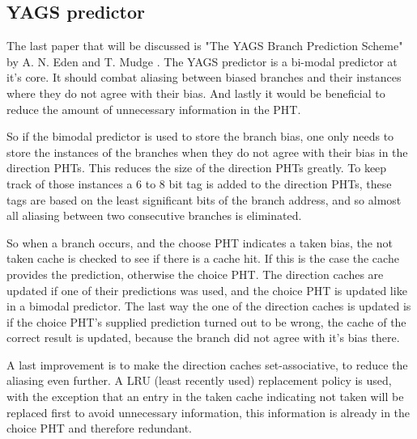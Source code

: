 \subsection{YAGS predictor}
\label{ssec:yags}
The last paper that will be discussed is "The YAGS Branch Prediction Scheme" by A. N. Eden and T. Mudge \cite{yags}.
The YAGS predictor is a bi-modal predictor at it's core.
It should combat aliasing between biased branches and their instances where they do not agree with their bias.
And lastly it would be beneficial to reduce the amount of unnecessary information in the PHT.

So if the bimodal predictor is used to store the branch bias, one only needs to store the instances of the branches when they do not agree with their bias in the direction PHTs.
This reduces the size of the direction PHTs greatly.
To keep track of those instances a 6 to 8 bit tag is added to the direction PHTs, these tags are based on the least significant bits of the branch address, and so almost all aliasing between two consecutive branches is eliminated.

So when a branch occurs, and the choose PHT indicates a taken bias, the not taken cache is checked to see if there is a cache hit.
If this is the case the cache provides the prediction, otherwise the choice PHT.
The direction caches are updated if one of their predictions was used, and the choice PHT is updated like in a bimodal predictor.
The last way the one of the direction caches is updated is if the choice PHT's supplied prediction turned out to be wrong, the cache of the correct result is updated, because the branch did not agree with it's bias there.

A last improvement is to make the direction caches set-associative, to reduce the aliasing even further.
A LRU (least recently used) replacement policy is used, with the exception that an entry in the taken cache indicating not taken will be replaced first to avoid unnecessary information, this information is already in the choice PHT and therefore redundant.